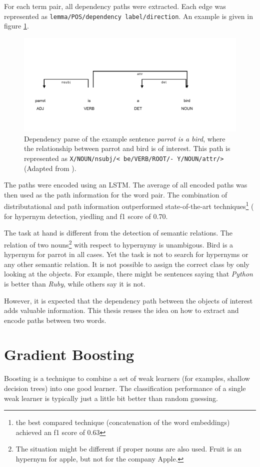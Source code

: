 For each term pair, all dependency paths were extracted. Each edge was represented as \texttt{lemma/POS/dependency label/direction}. An example is given in figure \ref{fig:hypenet}. 

\begin{figure}[h]
\centering
\caption{Dependency parse of the example sentence \emph{parrot is a bird}, where the relationship between parrot and bird is of interest. This path is represented as \texttt{X/NOUN/nsubj/< be/VERB/ROOT/- Y/NOUN/attr/>} (Adapted from \cite{DBLP:conf/acl/ShwartzGD16}).}
\label{fig:hypenet}
\includegraphics{images/hypenet_example}
\end{figure}


The paths were encoded using an LSTM. The average of all encoded paths was then used as the path information for the word pair. The combination of distributational and path information outperformed state-of-the-art techniques\footnote{the best compared technique (concatenation of the word embeddings) achieved an f1 score of 0.63} ( for hypernym detection, yiedling and f1 score of 0.70.\newline

The task at hand is different from the detection of semantic relations. The relation of two nouns\footnote{The situation might be different if proper nouns are also used. Fruit is an hypernym for apple, but not for the company Apple.} with respect to hypernymy is unambigous. Bird is a hypernym for parrot in all cases. Yet the task is not to search for hypernyms or any other semantic relation. It is not possible to assign the correct class by only looking at the objects. For example, there might be sentences saying that \emph{Python} is better than \emph{Ruby}, while others say it is not.

However, it is expected that the dependency path between the objects of interest adds valuable information. This thesis reuses the idea on how to extract and encode paths between two words.

\section{Gradient Boosting}
Boosting is a technique to combine a set of weak learners (for examples, shallow decision trees) into one good learner. The classification performance of a single weak learner is typically just a little bit better than random guessing.

